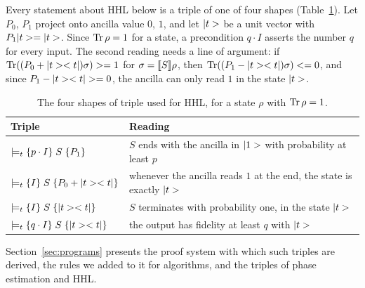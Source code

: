 Every statement about HHL below is a triple of one of four shapes (Table~\ref{tab:readings}). Let
$P_0$, $P_1$ project onto ancilla value $0$, $1$, and let $|t>$ be a unit vector with
$P_1|t>=|t>$. Since $\operatorname{Tr}\rho=1$ for a state, a precondition $q\cdot I$ asserts the number $q$ for
every input. The second reading needs a line of argument: if $\operatorname{Tr}((P_0+|t>< t|)\sigma)>=1$ for
$\sigma=\llbracket S\rrbracket\rho$, then $\operatorname{Tr}((P_1-|t>< t|)\sigma)<=0$, and since $P_1-\ketbra tt\ge0$, the
ancilla can only read $1$ in the state $|t>$.

\begin{table}[t]
\caption{The four shapes of triple used for HHL, for a state $\rho$ with $\operatorname{Tr}\rho=1$.}\label{tab:readings}
\centering\small
\begin{tabular}{@{}l>{\raggedright\arraybackslash}p{6.9cm}@{}}
\toprule
Triple & Reading\\
\midrule
$\models_{t}\{p\cdot I\}\;S\;\{P_1\}$ & $S$ ends with the ancilla in $|1>$ with probability at least $p$\\
$\models_{t}\{I\}\;S\;\{P_0+|t>< t|\}$ & whenever the ancilla reads $1$ at the end, the state is exactly $|t>$\\
$\models_{t}\{I\}\;S\;\{|t>< t|\}$ & $S$ terminates with probability one, in the state $|t>$\\
$\models_{t}\{q\cdot I\}\;S\;\{|t>< t|\}$ & the output has fidelity at least $q$ with $|t>$\\
\bottomrule
\end{tabular}
\end{table}

Section~\ref{sec:programs} presents the proof system with which such triples are derived, the rules
we added to it for algorithms, and the triples of phase estimation and HHL.
